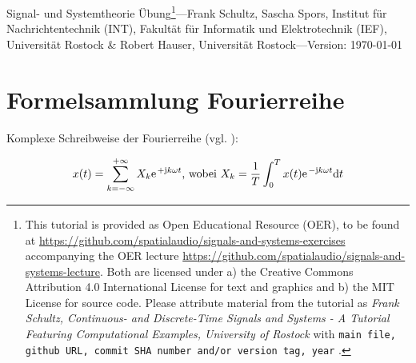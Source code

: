 \documentclass[11pt,a4paper,DIV=12]{scrartcl}
\begin{document}
\noindent Signal- und Systemtheorie Übung\footnote{This tutorial is provided as
Open Educational Resource (OER), to be found at
\url{https://github.com/spatialaudio/signals-and-systems-exercises}
accompanying the OER lecture
\url{https://github.com/spatialaudio/signals-and-systems-lecture}.
%
Both are licensed under a) the Creative Commons Attribution 4.0 International
License for text and graphics and b) the MIT License for source code.
%
Please attribute material from the tutorial as \textit{Frank Schultz,
Continuous- and Discrete-Time Signals and Systems - A Tutorial Featuring
Computational Examples, University of Rostock} with
\texttt{main file, github URL, commit SHA number and/or version tag, year}
.}---Frank Schultz, Sascha Spors,
Institut für Nachrichtentechnik (INT),
Fakultät für Informatik und Elektrotechnik (IEF),
Universität Rostock \&
Robert Hauser, Universität Rostock---Version: \today


\section*{Formelsammlung Fourierreihe}

Komplexe Schreibweise der Fourierreihe (vgl. \cite[S. 488]{Bronstein}):

\begin{align}
	x(t)=\sum_{k=-\infty}^{+\infty}X_k\e^{+\im k \omega t}\text{, wobei }X_k=\frac{1}{T}\int_{0}^{T}x(t)\e^{-\im k \omega t}\mathrm{d}t
\end{align}
\end{document}
